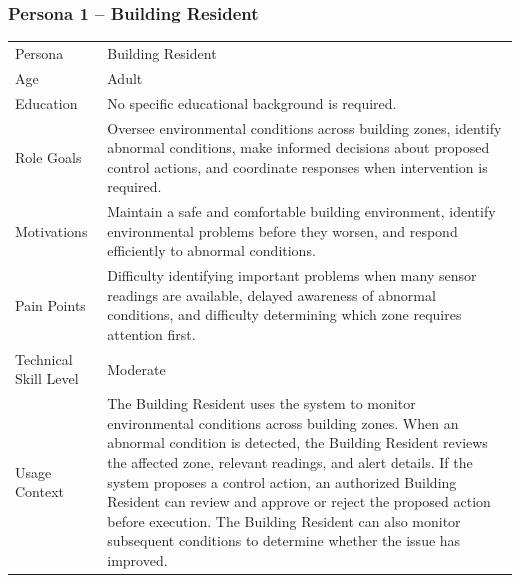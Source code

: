 \documentclass[11pt,a4paper]{article}
\begin{document}
\subsubsection*{Persona 1 -- Building Resident}
\noindent\begin{minipage}{\linewidth}
\label{tab:p1}
{\small\stripe
\begin{tabularx}{\linewidth}{|B{3.6cm}|Y|}
\hline\headrow {} & \\\hline
Persona & Building Resident\\\hline
Age & Adult\\\hline
Education & No specific educational background is required.\\\hline
Role Goals & Oversee environmental conditions across building zones, identify abnormal conditions, make informed decisions about proposed control actions, and coordinate responses when intervention is required.\\\hline
Motivations & Maintain a safe and comfortable building environment, identify environmental problems before they worsen, and respond efficiently to abnormal conditions.\\\hline
Pain Points & Difficulty identifying important problems when many sensor readings are available, delayed awareness of abnormal conditions, and difficulty determining which zone requires attention first.\\\hline
Technical Skill Level & Moderate\\\hline
Usage Context & The Building Resident uses the system to monitor environmental conditions across building zones. When an abnormal condition is detected, the Building Resident reviews the affected zone, relevant readings, and alert details. If the system proposes a control action, an authorized Building Resident can review and approve or reject the proposed action before execution. The Building Resident can also monitor subsequent conditions to determine whether the issue has improved.\\\hline
\end{tabularx}}
\end{minipage}
\medskip
\end{document}
